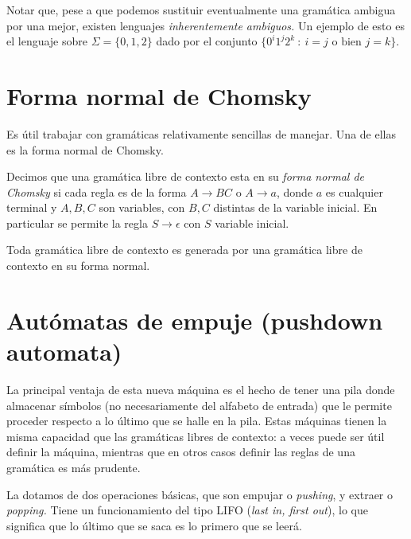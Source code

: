 \begin{obs}
    Notar que, pese a que podemos sustituir eventualmente una gram\'atica ambigua por una mejor, existen lenguajes \emph{inherentemente ambiguos.}
    Un ejemplo de esto es el lenguaje sobre \(\Sigma=\{0,1,2\}\) dado por el conjunto \(\{0^i1^j2^k\ :\ i=j \text{ o bien } j=k\}\).
\end{obs}

\section{Forma normal de Chomsky}

Es \'util trabajar con gram\'aticas relativamente sencillas de manejar. Una de ellas es la forma normal de Chomsky.

\begin{definicion}
    Decimos que una gram\'atica libre de contexto esta en su \emph{forma normal de Chomsky} si cada regla es de la forma \(A\to BC\) o \(A\to a\), donde \(a\) es cualquier terminal y \(A, B, C\) son variables, con \(B,C\) distintas de la variable inicial. En particular se permite la regla \(S\to\epsilon\) con \(S\) variable inicial.
\end{definicion}

\begin{teorema}
    Toda gram\'atica libre de contexto es generada por una gram\'atica libre de contexto en su forma normal.
\end{teorema}

\section[Aut\'omatas de empuje]{Aut\'omatas de empuje (pushdown automata)}

La principal ventaja de esta nueva m\'aquina es el hecho de tener una pila donde almacenar s\'imbolos (no necesariamente del alfabeto de entrada) que le permite proceder respecto a lo \'ultimo que se halle en la pila.
Estas m\'aquinas tienen la misma capacidad que las gram\'aticas libres de contexto: a veces puede ser \'util definir la m\'aquina, mientras que en otros casos definir las reglas de una gram\'atica es m\'as prudente.

La dotamos de dos operaciones b\'asicas, que son empujar o \emph{pushing}, y extraer o \emph{popping.}
Tiene un funcionamiento del tipo LIFO (\emph{last in, first out}), lo que significa que lo \'ultimo que se saca es lo primero que se leer\'a.
